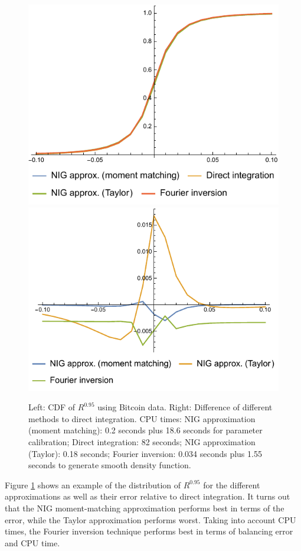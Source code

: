 \begin{figure}[t]
  \centering
  \includegraphics[scale=.8]{_pics/NIG1.pdf}
  \includegraphics[scale=.8]{_pics/NIG2.pdf}
  \caption{Left: CDF of $R^{0.95}$ using Bitcoin data. Right:
    Difference of different methods to direct integration. CPU times:
    NIG approximation (moment matching): 0.2 seconds plus 18.6 seconds
    for parameter calibration; Direct integration: 82 seconds; NIG 
    approximation (Taylor): 0.18 seconds; Fourier inversion: 0.034
    seconds plus 1.55 seconds to generate smooth density function.}
  \label{fig:NIGs}
\end{figure}

Figure \ref{fig:NIGs} shows an example of the distribution of
$R^{0.95}$ for the different approximations as well as their error
relative to direct integration. It turns out that the NIG
moment-matching approximation performs best in terms of the error,
while the Taylor approximation performs worst. Taking into account CPU
times, the Fourier inversion technique performs best in terms of
balancing error and CPU time. 



